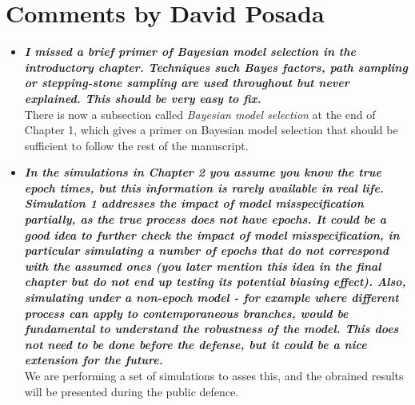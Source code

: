\documentclass[english]{article}
\begin{document}
\section*{Comments by David Posada}

\begin{itemize}

\item {
{\it
\textbf{
I missed a brief primer of Bayesian model selection in the introductory chapter.
Techniques such Bayes factors, path sampling or stepping-stone sampling are used throughout but never explained. 
This should be very easy to fix.
}%
}%
}%
\\
There is now a subsection called \emph{Bayesian model selection} at the end of Chapter 1, which gives a primer on Bayesian model selection that should be sufficient to follow the rest of the manuscript.



\item {
{\it
\textbf{
In the simulations in Chapter 2 you assume you know the true epoch times, but this information is rarely available in real life. 
Simulation 1 addresses the impact of model misspecification partially, as the true process does not have epochs. 
It could be a good idea to further check the impact of model misspecification, in particular simulating a number of epochs that do not correspond with the assumed ones (you later mention this idea in the final chapter but do not end up testing its potential biasing effect). 
Also, simulating under a non-epoch model - for example where different process can apply to contemporaneous branches, would be fundamental to understand the robustness of the model. 
This does not need to be done before the defense, but it could be a nice extension for the future.
}%
}%
}%
\\
We are performing a set of simulations to asses this, and the obrained results will be presented during the public defence.



\end{itemize}
\end{document}
